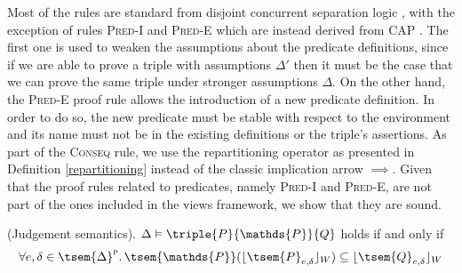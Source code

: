Most of the rules are standard from disjoint concurrent separation logic \cite{csl}, with the exception of rules \textsc{Pred-I} and \textsc{Pred-E} which are instead derived from CAP \cite{cap}. The first one is used to weaken the assumptions about the predicate definitions, since if we are able to prove a triple with assumptions $\Delta'$ then it must be the case that we can prove the same triple under stronger assumptions $\Delta$. On the other hand, the \textsc{Pred-E} proof rule allows the introduction of a new predicate definition. In order to do so, the new predicate must be stable with respect to the environment and its name must not be in the existing definitions or the triple's assertions. As part of the \textsc{Conseq} rule, we use the repartitioning operator as presented in Definition \ref{repartitioning} instead of the classic implication arrow $\implies$. Given that the proof rules related to predicates, namely \textsc{Pred-I} and \textsc{Pred-E}, are not part of the ones included in the views framework, we show that they are sound.

\begin{defn}
	(Judgement semantics).
	$\Delta \vDash \triple{P}{\mathds{P}}{Q}$ holds if and only if
	\[
		\forall e, \delta \in \tsem{\Delta}^\textsc{p} \ldotp \tsem{\mathds{P}}(\lfloor \tsem{P}_{e, \delta} \rfloor_W) \subseteq \lfloor \tsem{Q}_{e, \delta} \rfloor_W
	\]
\end{defn}


